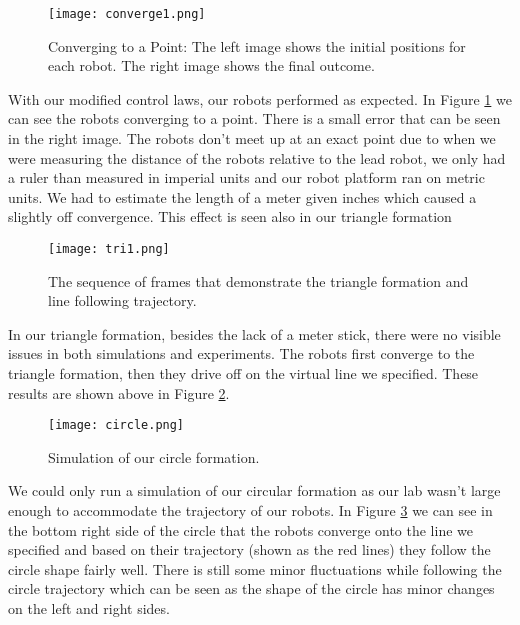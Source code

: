 \documentclass[12pt]{article}
\begin{document}
\begin{figure}[htp!]
	\begin{center}
		\texttt{[image: converge1.png]}
		\caption{Converging to a Point: The left image shows the initial positions for each robot. The right image shows the final outcome.} \label{fig.converge}
	\end{center}
\end{figure}

With our modified control laws, our robots performed as expected. In Figure \ref{fig.converge} we can see the robots converging to a point. There is a small error that can be seen in the right image. The robots don't meet up at an exact point due to when we were measuring the distance of the robots relative to the lead robot, we only had a ruler than measured in imperial units and our robot platform ran on metric units. We had to estimate the length of a meter given inches which caused a slightly off convergence. This effect is seen also in our triangle formation 


\begin{figure}[htp!]
	\begin{center}
		\texttt{[image: tri1.png]}
		\caption{The sequence of frames that demonstrate the triangle formation and line following trajectory.} \label{fig.triangle}
	\end{center}
\end{figure}


In our triangle formation, besides the lack of a meter stick, there were no visible issues in both simulations and experiments. The robots first converge to the triangle formation, then they drive off on the virtual line we specified. These results are shown above in Figure \ref{fig.triangle}.


\begin{figure}[htp!]
	\begin{center}
		\texttt{[image: circle.png]}
		\caption{Simulation of our circle formation.} \label{fig.circle1}
	\end{center}
\end{figure}


We could only run a simulation of our circular formation as our lab wasn't large enough to accommodate the trajectory of our robots. In Figure \ref{fig.circle1} we can see in the bottom right side of the circle that the robots converge onto the line we specified and based on their trajectory (shown as the red lines) they follow the circle shape fairly well. There is still some minor fluctuations while following the circle trajectory which can be seen as the shape of the circle has minor changes on the left and right sides.
\end{document}
